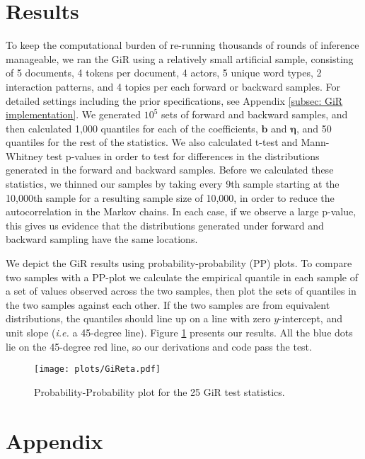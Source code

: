 \documentclass[a4paper]{article}
\begin{document}
\section{Results}
To keep the computational burden of re-running thousands of rounds of inference manageable, we ran the GiR using a relatively small artificial sample, consisting of 5 documents, 4 tokens per document, 4 actors, 5 unique word types, 2 interaction patterns, and 4 topics per each forward or backward samples. For detailed settings including the prior specifications, see Appendix \ref{subsec: GiR implementation}.
We generated $10^5$ sets of forward and backward samples, and then calculated 1,000 quantiles for each of the coefficients, $\boldsymbol{b}$ and $\boldsymbol{\eta}$, and 50 quantiles for the rest of the statistics. We also calculated t-test and Mann-Whitney test p-values in order to test for differences in the distributions generated in the forward and backward samples. Before we calculated these statistics, we thinned our samples by taking every 9th sample starting at the 10,000th sample for a resulting sample size of 10,000, in order to reduce the autocorrelation in the Markov chains. In each case, if we observe a large p-value, this gives us evidence that the distributions generated under forward and backward sampling have the same locations. 

We depict the GiR results using probability-probability (PP) plots. To compare two samples with a PP-plot we calculate the empirical quantile in each sample of a set of values observed across the two samples, then plot the sets of quantiles in the two samples against each other. If the two samples are from equivalent distributions, the quantiles should line up on a line with zero $y$-intercept, and unit slope (\textit{i.e.} a 45-degree line). Figure \ref{fig:PPplot2} presents our results. All the blue dots lie on the
45-degree red line, so our derivations and code pass the test.
\begin{figure}[H]
	\centering
	\texttt{[image: plots/GiReta.pdf]} 
	\label{fig:PPplot2}
	\caption{Probability-Probability plot for the 25 GiR test statistics.}
\end{figure}


\appendix
 \section*{Appendix}
 \renewcommand{\thesubsection}{\Alph{subsection}}
\end{document}
